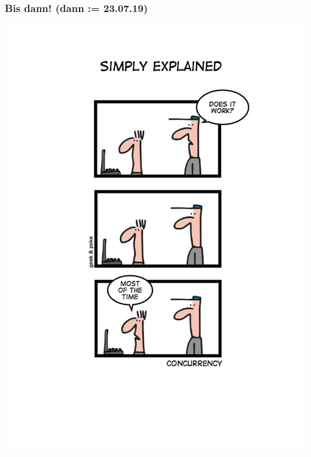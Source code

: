 \documentclass[18pt]{beamer}
\begin{document}
	\begin{frame}
		\frametitle{Bis dann! (dann  := 23.07.19)}
		\centering
		\includegraphics[scale=1.0]{./comics/geek_and_poke_concurrency.jpg}
	\end{frame}
\end{document}
